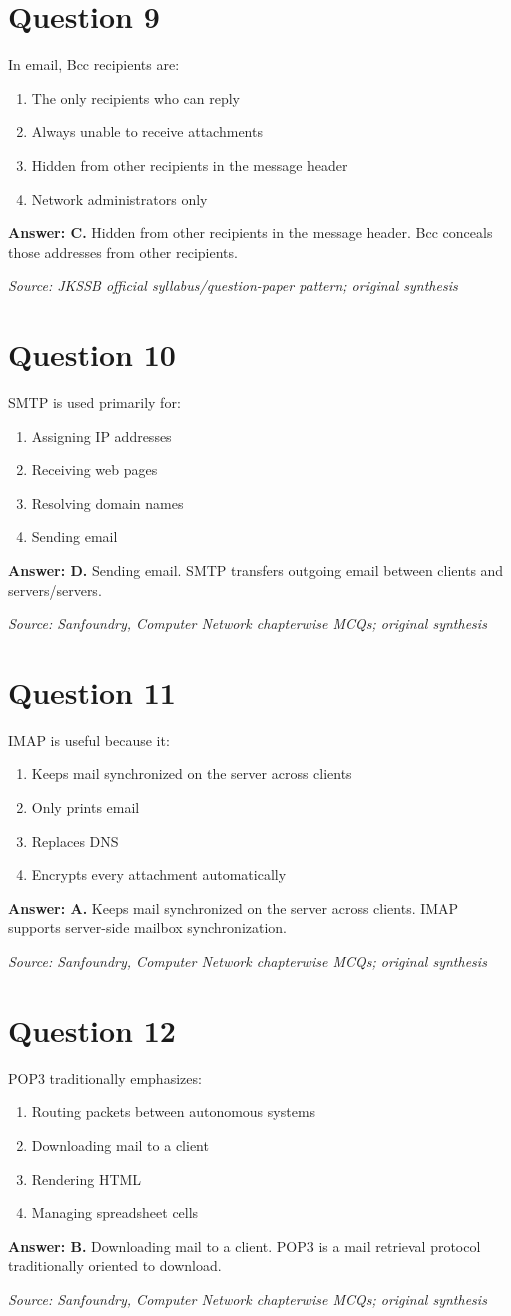 \documentclass[11pt,a4paper]{book}
\newcommand{\source}[1]{\par\smallskip\textit{Source: #1}}
\newcommand{\answer}[2]{\par\textbf{Answer: #1.} #2}
\begin{document}
\section*{Question 9}
In email, Bcc recipients are:
\begin{enumerate}[label=\Alph*.]
\item The only recipients who can reply
\item Always unable to receive attachments
\item Hidden from other recipients in the message header
\item Network administrators only
\end{enumerate}
\answer{C}{Hidden from other recipients in the message header. Bcc conceals those addresses from other recipients.}
\source{JKSSB official syllabus/question-paper pattern; original synthesis}
\section*{Question 10}
SMTP is used primarily for:
\begin{enumerate}[label=\Alph*.]
\item Assigning IP addresses
\item Receiving web pages
\item Resolving domain names
\item Sending email
\end{enumerate}
\answer{D}{Sending email. SMTP transfers outgoing email between clients and servers/servers.}
\source{Sanfoundry, Computer Network chapterwise MCQs; original synthesis}
\section*{Question 11}
IMAP is useful because it:
\begin{enumerate}[label=\Alph*.]
\item Keeps mail synchronized on the server across clients
\item Only prints email
\item Replaces DNS
\item Encrypts every attachment automatically
\end{enumerate}
\answer{A}{Keeps mail synchronized on the server across clients. IMAP supports server-side mailbox synchronization.}
\source{Sanfoundry, Computer Network chapterwise MCQs; original synthesis}
\section*{Question 12}
POP3 traditionally emphasizes:
\begin{enumerate}[label=\Alph*.]
\item Routing packets between autonomous systems
\item Downloading mail to a client
\item Rendering HTML
\item Managing spreadsheet cells
\end{enumerate}
\answer{B}{Downloading mail to a client. POP3 is a mail retrieval protocol traditionally oriented to download.}
\source{Sanfoundry, Computer Network chapterwise MCQs; original synthesis}
\end{document}
